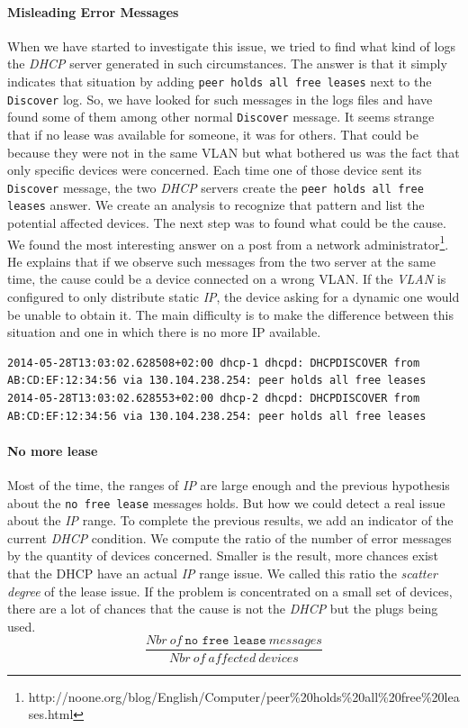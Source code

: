 \paragraph*{Misleading Error Messages} When we have started to investigate this issue, we tried to find what kind of logs the \emph{DHCP} server generated in such circumstances. The answer is that it simply indicates that situation by adding \texttt{peer holds all free leases} next to the \texttt{Discover} log. So, we have looked for such messages in the logs files and have found some of them among other normal \texttt{Discover} message. It seems strange that if no lease was available for someone, it was for others. That could be because they were not in the same VLAN but what bothered us was the fact that only specific devices were concerned. Each time one of those device sent its \texttt{Discover} message, the two \emph{DHCP} servers create the \texttt{peer holds all free leases} answer. We create an analysis to recognize that pattern and list the potential affected devices. The next step was to found what could be the cause. We found the most interesting answer on a post from a network administrator\footnote{http://noone.org/blog/English/Computer/peer\%20holds\%20all\%20free\%20leases.html}. He explains that if we observe such messages from the two server at the same time, the cause could be a device connected on a wrong VLAN. If the \emph{VLAN} is configured to only distribute static \emph{IP}, the device asking for a dynamic one would be unable to obtain it. The main difficulty is to make the difference between this situation and one in which there is no more IP available.

\begin{lstlisting}[frame=single,breaklines=true,caption={Misleading Error Message}]
2014-05-28T13:03:02.628508+02:00 dhcp-1 dhcpd: DHCPDISCOVER from AB:CD:EF:12:34:56 via 130.104.238.254: peer holds all free leases
2014-05-28T13:03:02.628553+02:00 dhcp-2 dhcpd: DHCPDISCOVER from AB:CD:EF:12:34:56 via 130.104.238.254: peer holds all free leases
\end{lstlisting}

\paragraph*{No more lease} Most of the time, the ranges of \emph{IP} are large enough and the previous hypothesis about the \texttt{no free lease} messages holds. But how we could detect a real issue about the \emph{IP} range. To complete the previous results, we add an indicator of the current \emph{DHCP} condition. We compute the ratio of the number of error messages by the quantity of devices concerned. Smaller is the result, more chances exist that the DHCP have an actual \emph{IP} range issue. We called this ratio the \emph{scatter degree} of the lease issue. If the problem is concentrated on a small set of devices, there are a lot of chances that the cause is not the \emph{DHCP} but the plugs being used.
\[ \frac{Nbr\ of\ \texttt{no free lease}\ messages}{Nbr\ of\ affected\ devices} \] 


